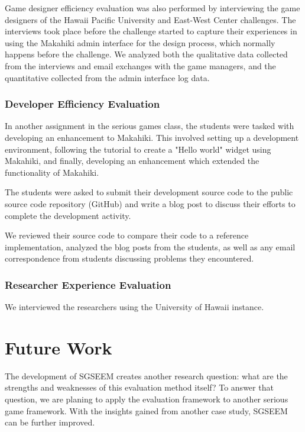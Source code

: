 \documentclass{sigchi}
\begin{document}
Game designer efficiency evaluation was also performed by interviewing
the game designers of the Hawaii Pacific University and East-West
Center challenges. The interviews took place before the
challenge started to capture their experiences in using the Makahiki
admin interface for the design process, which normally happens before
the challenge. We analyzed both the qualitative data collected from
the interviews and email exchanges with the game managers, and the
quantitative collected from the admin interface log data.

\subsubsection{Developer Efficiency Evaluation}

In another assignment in the serious games class, the students were
tasked with developing an enhancement to Makahiki. This
involved setting up a development environment, following the tutorial
to create a "Hello world" widget using Makahiki, and finally,
developing an enhancement which extended the functionality of Makahiki.

The students were asked to submit their development source code to the
public source code repository (GitHub) and write a blog post to
discuss their efforts to complete the development activity.

We reviewed their source code to compare their code to a reference
implementation, analyzed the blog posts from the students, as well as
any email correspondence from students discussing problems they encountered.

\subsubsection{Researcher Experience Evaluation}

We interviewed the researchers using the University of Hawaii
instance.

\section{Future Work}

The development of SGSEEM creates another research question:
what are the strengths and weaknesses of this evaluation method itself? To
answer that question, we are planing to apply the evaluation framework
to another serious game framework.
With the insights gained from another case study, SGSEEM can be further
improved.
\end{document}
